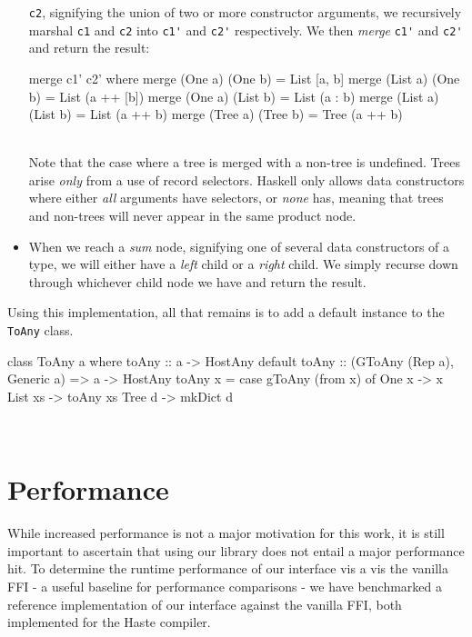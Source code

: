 \documentclass[preprint]{sigplanconf}
\begin{document}
\begin{itemize}
  \lstinline!c2!, signifying the union of two or more constructor arguments,
  we recursively marshal \lstinline!c1! and \lstinline!c2! into
  \lstinline!c1'! and \lstinline!c2'! respectively. We then \emph{merge}
  \lstinline!c1'! and \lstinline!c2'! and return the result:
  \begin{code}
    merge c1' c2'
      where
        merge (One a) (One b)   = List [a, b]
        merge (List a) (One b)  = List (a ++ [b])
        merge (One a) (List b)  = List (a : b)
        merge (List a) (List b) = List (a ++ b)
        merge (Tree a) (Tree b) = Tree (a ++ b)
  \end{code}\\
  Note that the case where a tree is merged with a non-tree is undefined.
  Trees arise \emph{only} from a use of record selectors. Haskell only
  allows data constructors where either \emph{all} arguments have selectors,
  or \emph{none} has, meaning that trees and non-trees will never appear in
  the same product node.
\item
  When we reach a \emph{sum} node, signifying one of several data constructors
  of a type, we will either have a \emph{left} child or a \emph{right} child.
  We simply recurse down through whichever child node we have and return the
  result.
\end{itemize}

Using this implementation, all that remains is to add a default instance to
the \lstinline!ToAny! class.\\
\begin{code}
  class ToAny a where
    toAny :: a -> HostAny
    default toAny :: (GToAny (Rep a), Generic a)
                  => a -> HostAny
    toAny x =
      case gToAny (from x) of
        One x   -> x
        List xs -> toAny xs
        Tree d  -> mkDict d
\end{code}\\
\section{Performance}
\label{sec:performance}
While increased performance is not a major motivation for this work, it is
still important to ascertain that using our library does not entail a major
performance hit. To determine the runtime performance of our interface
vis a vis the vanilla FFI - a useful baseline for performance comparisons - we
have benchmarked a reference implementation of our interface against the
vanilla FFI, both implemented for the Haste compiler.
\end{document}
